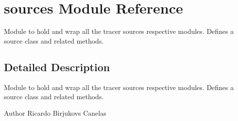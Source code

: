 \hypertarget{namespacesources}{}\section{sources Module Reference}
\label{namespacesources}


Module to hold and wrap all the tracer sources respective modules. Defines a source class and related methods.  




\subsection{Detailed Description}
Module to hold and wrap all the tracer sources respective modules. Defines a source class and related methods. 

\begin{DoxyAuthor}{Author}
Ricardo Birjukovs Canelas 
\end{DoxyAuthor}

